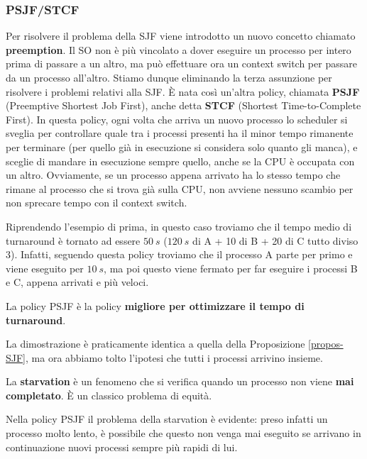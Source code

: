 \documentclass[11pt, a4paper, titlepage, oneside]{scrbook}
\begin{document}
\subsubsection*{PSJF/STCF}

Per risolvere il problema della SJF viene introdotto un nuovo concetto chiamato \textbf{preemption}. Il SO non è più vincolato a dover eseguire un processo per intero prima di passare a un altro, ma può effettuare ora un context switch per passare da un processo all'altro. Stiamo dunque eliminando la terza assunzione per risolvere i problemi relativi alla SJF. È nata così un'altra policy, chiamata \textbf{PSJF} (Preemptive Shortest Job First), anche detta \textbf{STCF} (Shortest Time-to-Complete First). In questa policy, ogni volta che arriva un nuovo processo lo scheduler si sveglia per controllare quale tra i processi presenti ha il minor tempo rimanente per terminare (per quello già in esecuzione si considera solo quanto gli manca), e sceglie di mandare in esecuzione sempre quello, anche se la CPU è occupata con un altro. Ovviamente, se un processo appena arrivato ha lo stesso tempo che rimane al processo che si trova già sulla CPU, non avviene nessuno scambio per non sprecare tempo con il context switch. 

Riprendendo l'esempio di prima, in questo caso troviamo che il tempo medio di turnaround è tornato ad essere \textbf{\boldmath$\SI[reset-math-version=false]{50}{s}$} ($\SI{120}{s}$ di A + 10 di B + 20 di C tutto diviso 3). Infatti, seguendo questa policy troviamo che il processo A parte per primo e viene eseguito per $\SI{10}{s}$, ma poi questo viene fermato per far eseguire i processi B e C, appena arrivati e più veloci. 

\begin{Proposizione}[Corollario]
\label{propos-corollario-PSJF}
La policy PSJF è la policy \textbf{migliore per ottimizzare il tempo di turnaround}.
\end{Proposizione}

La dimostrazione è praticamente identica a quella della Proposizione \ref{propos-SJF}, ma ora abbiamo tolto l'ipotesi che tutti i processi arrivino insieme. 

\begin{Definizione}[Starvation]
\label{def-starvation}
La \textbf{starvation} è un fenomeno che si verifica quando un processo non viene \textbf{mai completato}. È un classico problema di equità.
\end{Definizione}

Nella policy PSJF il problema della starvation è evidente: preso infatti un processo molto lento, è possibile che questo non venga mai eseguito se arrivano in continuazione nuovi processi sempre più rapidi di lui. 
\end{document}
